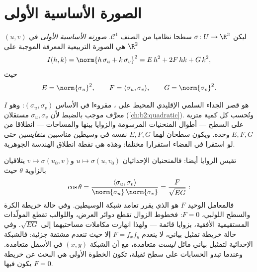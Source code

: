 \section{الصورة الأساسية الأولى}

\begin{definition}\label{def:b2:surfaces:fff}
ليكن $\sigma \colon U \to \R^3$ سطحا نظاميا من الصنف $\mathcal{C}^1$. \emph{صورته الأساسية
الأولى} في $(u,v)$ هي الصورة التربيعية
المعرفة الموجبة على $\R^2$
\[
I(h, k) = \norm{h\,\sigma_u + k\,\sigma_v}^2
= E\,h^2 + 2F\,hk + G\,k^2,
\]
حيث
\[
E = \norm{\sigma_u}^2,
\qquad
F = \langle \sigma_u, \sigma_v\rangle,
\qquad
G = \norm{\sigma_v}^2 .
\]
\end{definition}

\begin{remark}
$I$ هو قصر الجداء السلمي الإقليدي المحيط على ،
مقروءا في الأساس $(\sigma_u, \sigma_v)$: وهو معرَّف موجب بالضبط لأن $\sigma_u, \sigma_v$ مستقلان
(\cref{ch:b2:quadratic}). وتُحسب كل كمية مترية على السطح --- أطوال المنحنيات
المرسومة والزوايا بينها والمساحات --- انطلاقا من $E, F, G$ وحده.
ويكون سطحان لهما $E,
F, G$ نفسه في وسيطين مناسبين \emph{متقايسين} حتى
لو استقرا في الفضاء استقرارا مختلفا: وهذه هي نقطة انطلاق الهندسة
الجوهرية.
\end{remark}

\begin{example}\label{ex:b2:surfaces:coordangle}
تقيس  الزوايا أيضا: فالمنحنيان الإحداثيان
$u \mapsto \sigma(u, v_0)$ و$v \mapsto
\sigma(u_0, v)$ يتلاقيان بالزاوية $\theta$ حيث
\[
\cos\theta = \frac{\langle\sigma_u,
\sigma_v\rangle}{\norm{\sigma_u}\,\norm{\sigma_v}}
= \frac{F}{\sqrt{EG}} :
\]
فالمعامل الوحيد $F$ هو الذي يقرر تعامد شبكة الوسيطين. وفي حالة
خريطة الكرة والسطح اللولبي، $F =
0$: فخطوط الزوال تقطع دوائر العرض،
واللوالب تقطع المولّدات المستقيمية الأفقية، بزوايا قائمة --- ولهذا
انهارت مكاملات مساحتيهما إلى $\sqrt{EG}$. وفي حالة خريطة تمثيل بياني، لا
ينعدم $F = f_xf_y$ إلا حيث تنعدم مشتقة جزئية: فالشبكة الإحداثية لتمثيل
بياني مائل \emph{ليست} متعامدة، مع أن الشبكة $(x, y)$ في الأسفل
متعامدة. وعندما تبدو الحسابات على سطح ثقيلة، تكون الخطوة الأولى هي
البحث عن خريطة يكون فيها $F = 0$.
\end{example}

